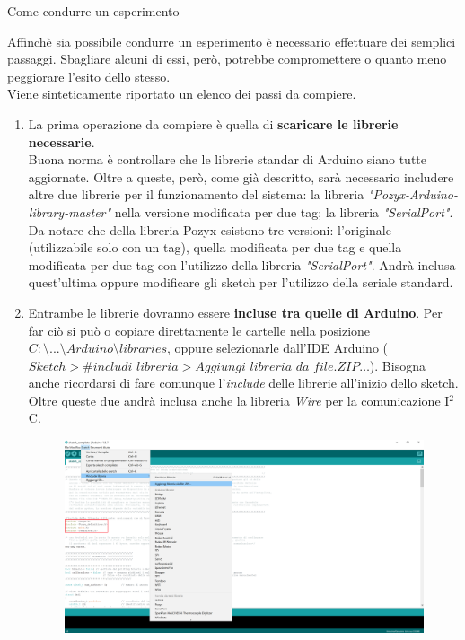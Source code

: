 \documentclass[12pt]{report}
\begin{document}
	\begin{section}{Come condurre un esperimento}
 		
		Affinchè sia possibile condurre un esperimento è necessario effettuare dei semplici passaggi. Sbagliare alcuni di essi, però, potrebbe compromettere o quanto meno peggiorare l'esito dello stesso.\\
		Viene sinteticamente riportato un elenco dei passi da compiere.
		\begin{enumerate}
				\item La prima operazione da compiere è quella di \textbf{scaricare le librerie necessarie}.\\ Buona norma è controllare che le librerie standar di Arduino siano tutte aggiornate. Oltre a queste, però, come già descritto, sarà necessario includere altre due librerie per il funzionamento del sistema:	
						la libreria \textit{"Pozyx-Arduino-library-master"} nella versione modificata per due tag; la libreria \textit{"SerialPort"}. Da notare che della libreria Pozyx esistono tre versioni: l'originale (utilizzabile solo con un tag), quella modificata per due tag e quella modificata per due tag con l'utilizzo della  libreria 									\textit{"SerialPort"}. Andrà inclusa quest'ultima oppure modificare gli sketch per l'utilizzo della seriale standard. 
				\item Entrambe le librerie dovranno essere \textbf{incluse tra quelle di Arduino}. Per far ciò si può o copiare direttamente le cartelle nella posizione $C:\setminus...\setminus Arduino\setminus libraries$, oppure selezionarle dall'IDE Arduino ($Sketch>\#includi$ $libreria>Aggiungi$ $libreria$ $da$ $file 										.ZIP…$). Bisogna anche ricordarsi di fare comunque l'\textit{include} delle librerie all'inizio dello sketch. Oltre queste due andrà inclusa anche la libreria \textit{Wire} per la comunicazione I$^2$C.
					\begin{figure}[H]
						\centering
						\includegraphics[scale=0.15]{Cattura}

\end{figure}
\end{enumerate}
\end{section}
\end{document}
